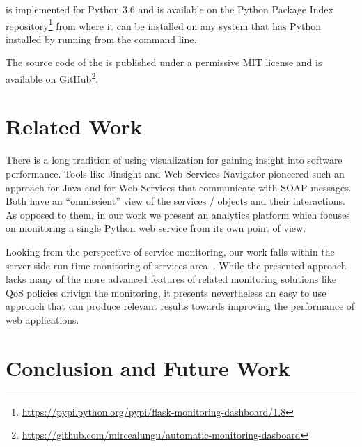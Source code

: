 \documentclass[conference]{IEEEtran}
\begin{document}
    \tool is implemented for Python 3.6 and is available on the Python Package Index repository\footnote{\url{https://pypi.python.org/pypi/flask-monitoring-dashboard/1.8}} from where it can be installed on any system that has Python installed by running \install from the command line. 

    The source code of the \tool is published under a permissive MIT license and is available on GitHub\footnote{\url{https://github.com/mircealungu/automatic-monitoring-dasboard}}.



\section{Related Work}
\label{sec:related}

There is a long tradition of using visualization for gaining insight into software performance. Tools like Jinsight \cite{Pauw02a} and Web Services Navigator \cite{Pauw05} pioneered such an approach for Java and for Web Services that communicate with SOAP messages. Both have an ``omniscient'' view of the services / objects and their interactions. As opposed to them, in our work we present an analytics platform which focuses on monitoring a single Python web service from its own point of view.

Looking from the perspective of service monitoring, our work falls within the server-side run-time monitoring of services area~\cite{ghezzi2007run}. While the presented approach lacks many of the more advanced features of related monitoring solutions like QoS policies drivign the monitoring, it presents nevertheless an easy to use approach that can produce relevant results towards improving the performance of web applications. 




\section{Conclusion and Future Work}
\end{document}
